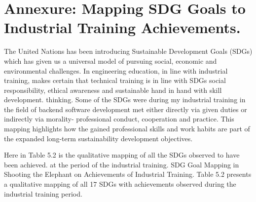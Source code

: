 \clearpage
\chapter*{Annexure: Mapping SDG Goals to
Industrial Training Achievements.}

The United Nations has been introducing Sustainable Development Goals (SDGs) which
has given us a universal model of pursuing social, economic and environmental challenges. In engineering education, in line with industrial training, makes certain that
technical training is in line with SDGs social responsibility, ethical awareness and sustainable hand in hand with skill development. thinking. Some of the SDGs were during
my industrial training in the field of backend software development met either directly
via given duties or indirectly via morality- professional conduct, cooperation and practice. This mapping highlights how the gained professional skills and work habits are
part of the expanded long-term sustainability development objectives. 

\par Here in Table
5.2 is the qualitative mapping of all the SDGs observed to have been achieved. at the
period of the industrial training.
SDG Goal Mapping in Shooting the Elephant on Achievements of Industrial Training.
Table 5.2 presents a qualitative mapping of all 17 SDGs with achievements observed
during the industrial training period.


